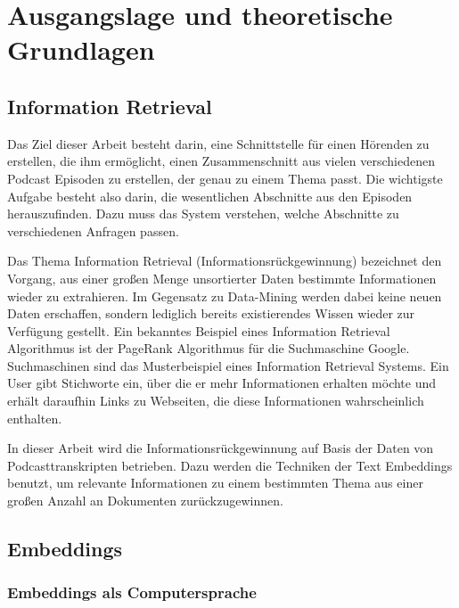 \chapter{Ausgangslage und theoretische Grundlagen}\label{ch:theoretical}


\section{Information Retrieval}

Das Ziel dieser Arbeit besteht darin, eine Schnittstelle für einen Hörenden zu erstellen, die ihm ermöglicht, einen Zusammenschnitt aus vielen verschiedenen Podcast Episoden zu erstellen, der genau zu einem Thema passt. 
Die wichtigste Aufgabe besteht also darin, die wesentlichen Abschnitte aus den Episoden herauszufinden. 
Dazu muss das System verstehen, welche Abschnitte zu verschiedenen Anfragen passen. 

Das Thema Information Retrieval (Informationsrückgewinnung) bezeichnet den Vorgang, aus einer großen Menge unsortierter Daten bestimmte Informationen wieder zu extrahieren.
Im Gegensatz zu Data-Mining werden dabei keine neuen Daten erschaffen, sondern lediglich bereits existierendes Wissen wieder zur Verfügung gestellt.
Ein bekanntes Beispiel eines Information Retrieval Algorithmus ist der PageRank Algorithmus für die Suchmaschine Google.
Suchmaschinen sind das Musterbeispiel eines Information Retrieval Systems.
Ein User gibt Stichworte ein, über die er mehr Informationen erhalten möchte und erhält daraufhin Links zu Webseiten, die diese Informationen wahrscheinlich enthalten.

In dieser Arbeit wird die Informationsrückgewinnung auf Basis der Daten von Podcasttranskripten betrieben.
Dazu werden die Techniken der Text Embeddings benutzt, um relevante Informationen zu einem bestimmten Thema aus einer großen Anzahl an Dokumenten zurückzugewinnen.



\section{Embeddings}

\subsection{Embeddings als Computersprache}


